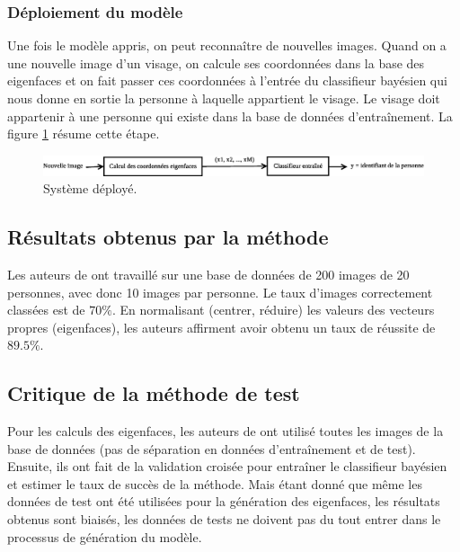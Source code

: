 \subsubsection{Déploiement du modèle}
Une fois le modèle appris, on peut reconnaître de nouvelles images. Quand on a une nouvelle
image d'un visage, on calcule ses coordonnées dans la base des eigenfaces et on fait
passer ces coordonnées à l'entrée du classifieur bayésien qui nous donne en sortie la
personne à laquelle appartient le visage. Le visage doit appartenir à une personne qui existe
dans la base de données d'entraînement. La figure \ref{fig:article:etapes_deploiement}
résume cette étape.
\begin{figure}[H]
    \centering
    \includegraphics[scale=0.4]{images/article_etapes_deploiement}
    \caption{Système déployé.}
    \label{fig:article:etapes_deploiement}
\end{figure}


\subsection{Résultats obtenus par la méthode}
Les auteurs de \cite{article} ont travaillé sur une base de données
de 200 images de 20 personnes, avec donc 10 images par personne.
Le taux d'images correctement classées est de $70\%$. En normalisant
(centrer, réduire) les valeurs des vecteurs propres (eigenfaces),
les auteurs affirment avoir obtenu un taux de réussite de $89.5\%$.


\subsection{Critique de la méthode de test}
Pour les calculs des eigenfaces, les auteurs de \cite{article} ont
utilisé toutes les images de la base de données (pas de séparation
en données d'entraînement et de test). Ensuite, ils ont fait de la
validation croisée pour entraîner le classifieur bayésien et estimer
le taux de succès de la méthode. Mais étant donné que même les 
données de test ont été utilisées pour la génération des eigenfaces,
les résultats obtenus sont biaisés, les données de tests ne doivent
pas du tout entrer dans le processus de génération du modèle.